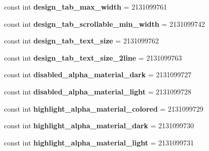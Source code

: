 \begin{DoxyCompactItemize}
const int {\bfseries design\+\_\+tab\+\_\+max\+\_\+width} = 2131099761
\item 
\mbox{\label{classXaria_1_1Resource_1_1Dimension_a440f18088be66256091c414bc56c4742}} 
const int {\bfseries design\+\_\+tab\+\_\+scrollable\+\_\+min\+\_\+width} = 2131099742
\item 
\mbox{\label{classXaria_1_1Resource_1_1Dimension_adb043aa4d13e36645794b1d7468bd778}} 
const int {\bfseries design\+\_\+tab\+\_\+text\+\_\+size} = 2131099762
\item 
\mbox{\label{classXaria_1_1Resource_1_1Dimension_a21bec5fddc7ba47a85b194a53f705a86}} 
const int {\bfseries design\+\_\+tab\+\_\+text\+\_\+size\+\_\+2line} = 2131099763
\item 
\mbox{\label{classXaria_1_1Resource_1_1Dimension_ab2fd555fb4fa49a8ce516320286fe56b}} 
const int {\bfseries disabled\+\_\+alpha\+\_\+material\+\_\+dark} = 2131099727
\item 
\mbox{\label{classXaria_1_1Resource_1_1Dimension_ab110cd029830e1e28213223ade825c89}} 
const int {\bfseries disabled\+\_\+alpha\+\_\+material\+\_\+light} = 2131099728
\item 
\mbox{\label{classXaria_1_1Resource_1_1Dimension_a423a1f87948f980162aba67d35eb3463}} 
const int {\bfseries highlight\+\_\+alpha\+\_\+material\+\_\+colored} = 2131099729
\item 
\mbox{\label{classXaria_1_1Resource_1_1Dimension_a8126755926b6ab7d686fafe61bfdfc6a}} 
const int {\bfseries highlight\+\_\+alpha\+\_\+material\+\_\+dark} = 2131099730
\item 
\mbox{\label{classXaria_1_1Resource_1_1Dimension_a61fe291e2b6e4f89ff94b51f2ef5c831}} 
const int {\bfseries highlight\+\_\+alpha\+\_\+material\+\_\+light} = 2131099731
\item 
\mbox{\label{classXaria_1_1Resource_1_1Dimension_a9a10932e1cadbbffcdef9219aa97a5d3}} 

\end{DoxyCompactItemize}
